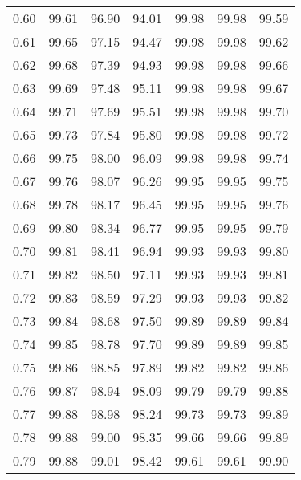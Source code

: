 \begin{tabular}{|c|c|c|c|c|c|c|}
      0.60 &     99.61 &     96.90 &      94.01 &   99.98 &      99.98 &         99.59 \\
      0.61 &     99.65 &     97.15 &      94.47 &   99.98 &      99.98 &         99.62 \\
      0.62 &     99.68 &     97.39 &      94.93 &   99.98 &      99.98 &         99.66 \\
      0.63 &     99.69 &     97.48 &      95.11 &   99.98 &      99.98 &         99.67 \\
      0.64 &     99.71 &     97.69 &      95.51 &   99.98 &      99.98 &         99.70 \\
      0.65 &     99.73 &     97.84 &      95.80 &   99.98 &      99.98 &         99.72 \\
      0.66 &     99.75 &     98.00 &      96.09 &   99.98 &      99.98 &         99.74 \\
      0.67 &     99.76 &     98.07 &      96.26 &   99.95 &      99.95 &         99.75 \\
      0.68 &     99.78 &     98.17 &      96.45 &   99.95 &      99.95 &         99.76 \\
      0.69 &     99.80 &     98.34 &      96.77 &   99.95 &      99.95 &         99.79 \\
      0.70 &     99.81 &     98.41 &      96.94 &   99.93 &      99.93 &         99.80 \\
      0.71 &     99.82 &     98.50 &      97.11 &   99.93 &      99.93 &         99.81 \\
      0.72 &     99.83 &     98.59 &      97.29 &   99.93 &      99.93 &         99.82 \\
      0.73 &     99.84 &     98.68 &      97.50 &   99.89 &      99.89 &         99.84 \\
      0.74 &     99.85 &     98.78 &      97.70 &   99.89 &      99.89 &         99.85 \\
      0.75 &     99.86 &     98.85 &      97.89 &   99.82 &      99.82 &         99.86 \\
      0.76 &     99.87 &     98.94 &      98.09 &   99.79 &      99.79 &         99.88 \\
      0.77 &     99.88 &     98.98 &      98.24 &   99.73 &      99.73 &         99.89 \\
      0.78 &     99.88 &     99.00 &      98.35 &   99.66 &      99.66 &         99.89 \\
      0.79 &     99.88 &     99.01 &      98.42 &   99.61 &      99.61 &         99.90 \\

\end{tabular}
